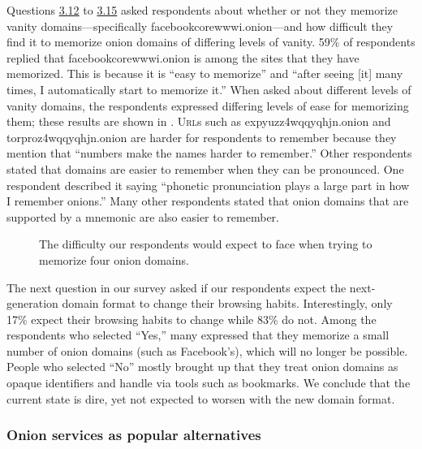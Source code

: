 Questions \hyperref[q3_12]{3.12} to \hyperref[q3_15]{3.15} asked respondents
about whether or not they memorize vanity domains---specifically
facebookcorewwwi.onion---and how difficult they find it to memorize onion
domains of differing levels of vanity.  59\% of respondents replied that
facebookcorewwwi.onion is among the sites that they have memorized.  This is
because it is ``easy to memorize'' and ``after seeing [it] many times, I
automatically start to memorize it.''  When asked about different levels of
vanity domains, the respondents expressed differing levels of ease for
memorizing them; these results are shown in .
\textsc{Url}s such as expyuzz4wqqyqhjn.onion and torproz4wqqyqhjn.onion are
harder for respondents to remember because they mention that ``numbers make the
names harder to remember.''  Other respondents stated that domains are easier to
remember when they can be pronounced.  One respondent described it saying
``phonetic pronunciation plays a large part in how I remember onions.'' Many
other respondents stated that onion domains that are supported by a mnemonic are
also easier to remember.  

\begin{figure}[t]
    \centering
    
    \caption{The difficulty our respondents would expect to face when trying to
    memorize four onion domains.}
    \label{fig:memorize-domains}
\end{figure}

The next question in our survey asked if our respondents expect the
next-generation domain format to change their browsing habits.  Interestingly,
only 17\% expect their browsing habits to change while 83\% do not.  Among the
respondents who selected ``Yes,'' many expressed that they memorize a small
number of onion domains (such as Facebook's), which will no longer be possible.
People who selected ``No'' mostly brought up that they treat onion domains as
opaque identifiers and handle via tools such as bookmarks.  We conclude that the
current state is dire, yet not expected to worsen with the new domain format.

\subsubsection{Onion services as popular alternatives}

